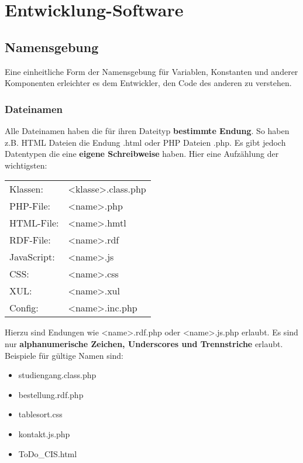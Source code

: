 \chapter{Entwicklung-Software}
\section{Namensgebung}
Eine einheitliche Form der Namensgebung f\"ur Variablen, Konstanten und anderer Komponenten erleichter es dem Entwickler, den Code des anderen zu verstehen.

\subsection{Dateinamen}
Alle Dateinamen haben die f\"ur ihren Dateityp {\bf bestimmte Endung}. So haben z.B. HTML Dateien die Endung .html oder PHP Dateien .php. 
Es gibt jedoch Datentypen die eine {\bf eigene Schreibweise} haben. Hier eine Aufz\"ahlung der wichtigsten: \newline



\begin{tabular}{ll}
Klassen: & <klasse>.class.php \\
PHP-File: & <name>.php \\
HTML-File: & <name>.hmtl \\
RDF-File: & <name>.rdf \\
JavaScript: & <name>.js \\
CSS: & <name>.css \\
XUL: & <name>.xul \\
Config: & <name>.inc.php \\
\end{tabular}

Hierzu sind Endungen wie <name>.rdf.php oder <name>.js.php erlaubt. \newline
Es sind nur {\bf alphanumerische Zeichen, Underscores und Trennstriche} erlaubt. Beispiele f\"ur g\"ultige Namen sind: \newline
\begin{itemize}
\item studiengang.class.php
\item bestellung.rdf.php
\item tablesort.css
\item kontakt.js.php
\item ToDo\_CIS.html
\end{itemize}

